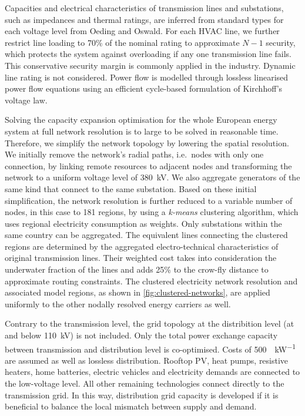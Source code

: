 
Capacities and electrical characteristics of transmission lines and substations,
such as impedances and thermal ratings, are
inferred from standard types for each voltage level from Oeding and Oswald. For each HVAC
line, we further restrict line loading to 70\% of the nominal rating to
approximate $N-1$ security, which protects the system against overloading if any
one transmission line fails. This conservative security margin is commonly
applied in the industry. Dynamic line rating is not considered. Power
flow is modelled through lossless linearised power flow equations using an
efficient cycle-based formulation of Kirchhoff's voltage law.


Solving the capacity expansion optimisation for the whole European energy system
at full network resolution is to large to be solved in reasonable time.
Therefore, we simplify the network topology by lowering the spatial resolution.
We initially remove the network's radial paths, i.e.~nodes with only one
connection, by linking remote resources to adjacent nodes and transforming the
network to a uniform voltage level of \SI{380}{\kilo\volt}. We also aggregate
generators of the same kind that connect to the same substation. Based on these
initial simplification, the network resolution is further reduced to a variable
number of nodes, in this case to 181 regions, by using a \textit{k-means}
clustering algorithm, which uses regional electricity consumption as weights.
 Only substations within the
same country can be aggregated. The equivalent lines connecting the clustered
regions are determined by the aggregated electro-technical characteristics of
original transmission lines. Their weighted cost takes into consideration the
underwater fraction of the lines and adds 25\% to the crow-fly distance to
approximate routing constraints. The clustered electricity network resolution
and associated model regions, as shown in \cref{fig:clustered-networks}, are
applied uniformly to the other nodally resolved energy carriers as well.


Contrary to the transmission level, the grid topology at the distribition level
(at and below \SI{110}{\kilo\volt}) is not included. Only the total power
exchange capacity between transmission and distribution level is co-optimised.
Costs of \SI{500}{\sieuro\per\kilo\watt} are assumed as well as lossless
distribution. Rooftop PV, heat pumps, resistive heaters, home batteries,
electric vehicles and electricity demands are connected to the low-voltage
level. All other remaining technologies connect directly to the transmission
grid. In this way, distribution grid capacity is developed if it is beneficial
to balance the local mismatch between supply and demand.